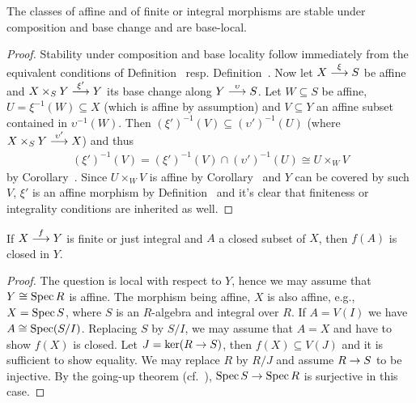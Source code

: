 \documentclass[a4paper,parskip=half,numbers=enddot, DIV=12]{scrreprt}
\begin{document}
\begin{cor}
    The classes of affine and of finite or integral morphisms are stable under composition and base change and are base-local.
\end{cor}
\begin{proof}
	Stability under composition and base locality follow immediately from the equivalent conditions of Definition~ resp. Definition~. Now let $X\morphism[\xi]S$ be affine and $X\times_SY\morphism[\xi']Y$ its base change along $Y\morphism[\upsilon] S$. Let $W\subseteq S$ be affine, $U=\xi^{-1}(W)\subseteq X$ (which is affine by assumption) and $V\subseteq Y$ an affine subset contained in $\upsilon^{-1}(W)$. Then $(\xi')^{-1}(V)\subseteq(\upsilon')^{-1}(U)$ (where $X\times_SY\morphism[\upsilon']X$) and thus
	\begin{align*}
		(\xi')^{-1}(V)=(\xi')^{-1}(V)\cap (\upsilon')^{-1}(U)\cong U\times_WV
	\end{align*}
	by Corollary~. Since $U\times_WV$ is affine by Corollary~ and $Y$ can be covered by such $V$, $\xi'$ is an affine morphism by Definition~ and it's clear that finiteness or integrality conditions are inherited as well.
\end{proof}
\begin{prop}
    If $X\morphism[f] Y$ is finite or just integral and $A$ a closed subset of $X$, then $f(A)$ is closed in $Y$.
\end{prop}
\begin{proof}
    The question is local with respect to $Y$, hence we may assume that $Y\cong \operatorname{Spec} R$ is affine. The morphism being affine, $X$ is also affine, e.g., $X= \operatorname{Spec} S$, where $S$ is an $R$-algebra and integral over $R$. If $A=V(I)$ we have $A\cong \operatorname{Spec}(S/I)$. Replacing $S$ by $S/I$, we may assume that $A=X$ and have to show $f(X)$ is closed. Let $J = \ker(R\morphism S)$, then $f(X)\subseteq V(J)$ and it is sufficient to show equality. We may replace $R$ by $R/J$ and assume $R\morphism S$ to be injective. By the going-up theorem (cf.\ \cite[Theorem~7]{alg1}), $\Spec S\morphism \Spec R$ is surjective in this case. 
\end{proof}
\end{document}
